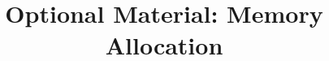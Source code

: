 \documentclass{article}
\begin{document}
\title{Optional Material: Memory Allocation}
\date{}
\maketitle


\end{document}
